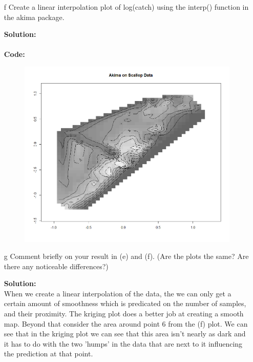 \documentclass[12pt]{article}
\makeatletter
\theoremstyle{homework}
\newenvironment{exercise}[1]
{\def\@currentlabel{#1}\exercisecore}
{\endexercisecore}
\newcommand{\localhead}[1]{\par\smallskip\noindent\textbf{#1}\nobreak\\}%
\newcommand\solution{\localhead{Solution:}}
\makeatother
\begin{document}
\begin{exercise}{2}
\begin{enumerate}
    \item[f] Create a linear interpolation plot of log(catch) using the interp() function in the akima package.
    \solution\\
    \textbf{Code:}
    \begin{center}
    
    \end{center}
    \begin{figure}[H]
      \begin{center}
      \includegraphics[width = \textwidth]{Rplot03.png}
      \end{center}
    \end{figure}
    \vspace{.15in}

    \item[g] Comment briefly on your result in (e) and (f). (Are the plots the same? Are there any noticeable differences?)
    \solution When we create a linear interpolation of the data, the we can only get a certain amount of smoothness which is predicated on the 
    number of samples, and their proximity. The kriging plot does a better job at creating a smooth map. Beyond that consider the area around point 
    6 from the (f) plot. We can see that in the kriging plot we can see that this area isn't nearly as dark and it has to do with the two 'humps' in the data 
    that are next to it influencing the prediction at that point.  

  \end{enumerate} 
\end{exercise}
\vspace{1in}
\end{document}
